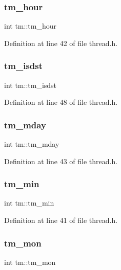 \subsubsection{\texorpdfstring{tm\_hour}{tm\_hour}}
{\footnotesize\ttfamily int tm\+::tm\+\_\+hour}



Definition at line 42 of file thread.\+h.

\mbox{\label{structtm_a5645ca0580c8ab2c24f6c2965d9c9f9c}} 
\subsubsection{\texorpdfstring{tm\_isdst}{tm\_isdst}}
{\footnotesize\ttfamily int tm\+::tm\+\_\+isdst}



Definition at line 48 of file thread.\+h.

\mbox{\label{structtm_ab8d8904bad43b0c8b96e61941c5b5310}} 
\subsubsection{\texorpdfstring{tm\_mday}{tm\_mday}}
{\footnotesize\ttfamily int tm\+::tm\+\_\+mday}



Definition at line 43 of file thread.\+h.

\mbox{\label{structtm_af414eb7c86cc3099595211eee4d4211b}} 
\subsubsection{\texorpdfstring{tm\_min}{tm\_min}}
{\footnotesize\ttfamily int tm\+::tm\+\_\+min}



Definition at line 41 of file thread.\+h.

\mbox{\label{structtm_a112ac36fa2f593777138a417cf031e17}} 
\subsubsection{\texorpdfstring{tm\_mon}{tm\_mon}}
{\footnotesize\ttfamily int tm\+::tm\+\_\+mon}



